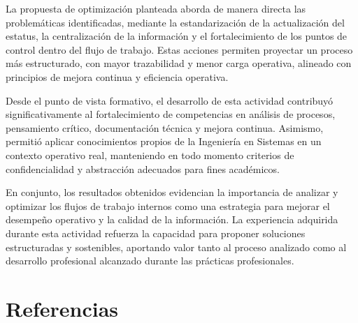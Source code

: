 \documentclass[12pt]{article}
\begin{document}
La propuesta de optimización planteada aborda de manera directa las problemáticas identificadas, mediante la estandarización de la actualización del estatus, la centralización de la información y el fortalecimiento de los puntos de control dentro del flujo de trabajo. Estas acciones permiten proyectar un proceso más estructurado, con mayor trazabilidad y menor carga operativa, alineado con principios de mejora continua y eficiencia operativa.

Desde el punto de vista formativo, el desarrollo de esta actividad contribuyó significativamente al fortalecimiento de competencias en análisis de procesos, pensamiento crítico, documentación técnica y mejora continua. Asimismo, permitió aplicar conocimientos propios de la Ingeniería en Sistemas en un contexto operativo real, manteniendo en todo momento criterios de confidencialidad y abstracción adecuados para fines académicos.

En conjunto, los resultados obtenidos evidencian la importancia de analizar y optimizar los flujos de trabajo internos como una estrategia para mejorar el desempeño operativo y la calidad de la información. La experiencia adquirida durante esta actividad refuerza la capacidad para proponer soluciones estructuradas y sostenibles, aportando valor tanto al proceso analizado como al desarrollo profesional alcanzado durante las prácticas profesionales.


\section*{Referencias}
\end{document}
